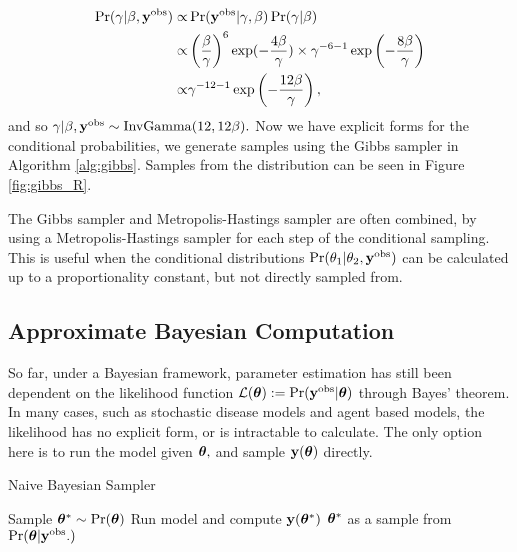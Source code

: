 \begin{example}
    \begin{align*}
        \Pr(\gamma|\beta, \mathbf{y}^{\mathrm{obs}})
        \propto & \Pr(\mathbf{y}^{\mathrm{obs}}|\gamma, \beta)\Pr(\gamma|\beta)         \\
        \propto &
        \left(\frac{\beta}{\gamma}\right)^{6}
        \exp( -\frac{4\beta}{\gamma})
        \times \gamma^{- 6 - 1}\exp\left(-\frac{8\beta}{\gamma}\right) \\
        \propto & \gamma^{- 12 - 1}
        \exp\left(-\frac{12\beta}{\gamma}\right),
    \end{align*}
    and so
    $\gamma|\beta, \mathbf{y}^{\mathrm{obs}}
        \sim \mathrm{InvGamma}(12, 12\beta).$
    Now we have explicit forms for the conditional probabilities,
    we generate samples using the Gibbs sampler in Algorithm \ref{alg:gibbs}.
    Samples from the distribution can be seen in Figure \ref{fig:gibbs_R}.
\end{example}

The Gibbs sampler and Metropolis-Hastings sampler are often combined, by
using a Metropolis-Hastings sampler for each step of the conditional sampling.
This is useful when the conditional distributions
$\Pr(\theta_1 | \theta_2, \mathbf{y}^{\mathrm{obs}})$ can be calculated up to a proportionality
constant, but not directly sampled from.

\subsection*{Approximate Bayesian Computation}

So far, under a Bayesian framework, parameter estimation has still been
dependent on the likelihood function
$\mathcal{L}(\bm{\theta}) := \Pr(\mathbf{y}^{\mathrm{obs}}|\bm{\theta})$ through Bayes' theorem.
In many cases, such as stochastic disease models and agent based models, the
likelihood has no explicit form, or is intractable to calculate.
The only option here is to run the model given $\bm{\theta},$
and sample $\mathbf{y}(\bm{\theta})$ directly.

\begin{algorithm}[htbp]
    \caption{Naive Bayesian Sampler}
    \label{alg:naive_samp}
    \begin{algorithmic}
        \State Sample $\bm{\theta}^\ast \sim \Pr(\bm{\theta})$
        \State Run model and compute $\mathbf{y}(\bm{\theta}^\ast)$
        \If{$\by(\btheta^\ast) = \by^\obs$}
        \State \Return $\bm{\theta}^\ast$ as a sample from $\Pr(\bm{\theta}|\mathbf{y}^{\mathrm{obs}}.)$
        \EndIf
    \end{algorithmic}
\end{algorithm}

